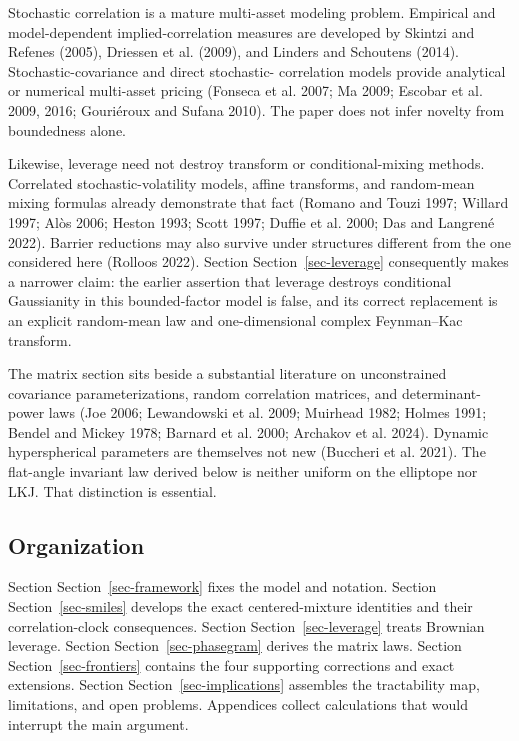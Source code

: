 \documentclass[
  english,
  11pt,
  letterpaper,
  DIV=11,
  numbers=noendperiod]{scrartcl}
\theoremstyle{plain}
\theoremstyle{plain}
\theoremstyle{plain}
\theoremstyle{plain}
\theoremstyle{remark}
\begin{document}
Stochastic correlation is a mature multi-asset modeling problem.
Empirical and model-dependent implied-correlation measures are developed
by Skintzi and Refenes (2005), Driessen et al. (2009), and Linders and
Schoutens (2014). Stochastic-covariance and direct stochastic-
correlation models provide analytical or numerical multi-asset pricing
(Fonseca et al. 2007; Ma 2009; Escobar et al. 2009, 2016; Gouriéroux and
Sufana 2010). The paper does not infer novelty from boundedness alone.

Likewise, leverage need not destroy transform or conditional-mixing
methods. Correlated stochastic-volatility models, affine transforms, and
random-mean mixing formulas already demonstrate that fact (Romano and
Touzi 1997; Willard 1997; Alòs 2006; Heston 1993; Scott 1997; Duffie et
al. 2000; Das and Langrené 2022). Barrier reductions may also survive
under structures different from the one considered here (Rolloos 2022).
Section Section~\ref{sec-leverage} consequently makes a narrower claim:
the earlier assertion that leverage destroys conditional Gaussianity in
this bounded-factor model is false, and its correct replacement is an
explicit random-mean law and one-dimensional complex Feynman--Kac
transform.

The matrix section sits beside a substantial literature on unconstrained
covariance parameterizations, random correlation matrices, and
determinant-power laws (Joe 2006; Lewandowski et al. 2009; Muirhead
1982; Holmes 1991; Bendel and Mickey 1978; Barnard et al. 2000; Archakov
et al. 2024). Dynamic hyperspherical parameters are themselves not new
(Buccheri et al. 2021). The flat-angle invariant law derived below is
neither uniform on the elliptope nor LKJ. That distinction is essential.

\subsection{Organization}\label{organization}

Section Section~\ref{sec-framework} fixes the model and notation.
Section Section~\ref{sec-smiles} develops the exact centered-mixture
identities and their correlation-clock consequences. Section
Section~\ref{sec-leverage} treats Brownian leverage. Section
Section~\ref{sec-phasegram} derives the matrix laws. Section
Section~\ref{sec-frontiers} contains the four supporting corrections and
exact extensions. Section Section~\ref{sec-implications} assembles the
tractability map, limitations, and open problems. Appendices collect
calculations that would interrupt the main argument.
\end{document}
